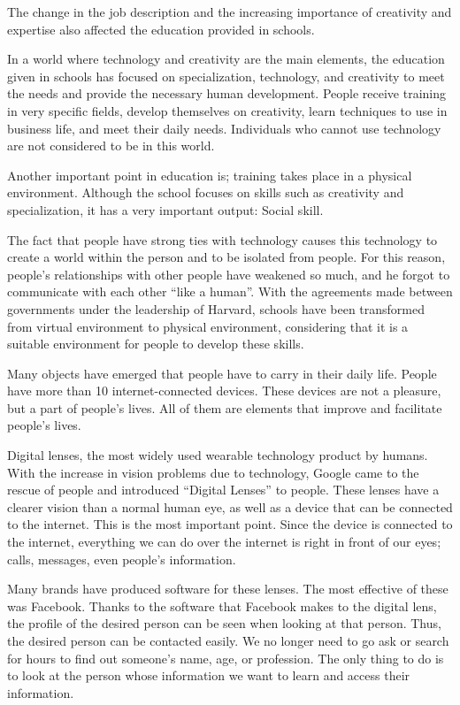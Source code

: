 \documentclass[]{book}
\begin{document}
The change in the job description and the increasing importance of creativity and expertise also affected the education provided in schools.

In a world where technology and creativity are the main elements, the education given in schools has focused on specialization, technology, and creativity to meet the needs and provide the necessary human development. People receive training in very specific fields, develop themselves on creativity, learn techniques to use in business life, and meet their daily needs. Individuals who cannot use technology are not considered to be in this world.

Another important point in education is; training takes place in a physical environment. Although the school focuses on skills such as creativity and specialization, it has a very important output: Social skill.

The fact that people have strong ties with technology causes this technology to create a world within the person and to be isolated from people. For this reason, people's relationships with other people have weakened so much, and he forgot to communicate with each other ``like a human''. With the agreements made between governments under the leadership of Harvard, schools have been transformed from virtual environment to physical environment, considering that it is a suitable environment for people to develop these skills.

Many objects have emerged that people have to carry in their daily life. People have more than 10 internet-connected devices. These devices are not a pleasure, but a part of people's lives. All of them are elements that improve and facilitate people's lives.

Digital lenses, the most widely used wearable technology product by humans. With the increase in vision problems due to technology, Google came to the rescue of people and introduced ``Digital Lenses'' to people. These lenses have a clearer vision than a normal human eye, as well as a device that can be connected to the internet. This is the most important point. Since the device is connected to the internet, everything we can do over the internet is right in front of our eyes; calls, messages, even people's information.

Many brands have produced software for these lenses. The most effective of these was Facebook. Thanks to the software that Facebook makes to the digital lens, the profile of the desired person can be seen when looking at that person. Thus, the desired person can be contacted easily. We no longer need to go ask or search for hours to find out someone's name, age, or profession. The only thing to do is to look at the person whose information we want to learn and access their information.
\end{document}
